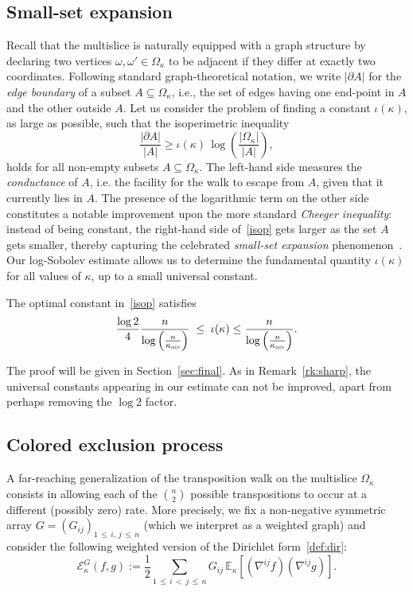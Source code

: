 \documentclass[AHL,Unicode,longabstracts,published]{cedram}
\newcommand{\EE}{\mathbb{E}}
\newcommand{\cE}{\mathcal{E}}
\newcommand{\am}{{\kappa_{\textsc{min}}}}
\begin{document}
\subsection{Small-set expansion}
Recall that the multislice is naturally equipped with a graph structure by declaring two vertices $\omega,\omega'\in\Omega_\kappa$ to be adjacent if they differ at exactly two coordinates. Following standard graph-theoretical notation, we write $|\partial A|$ for the \emph{edge boundary} of a subset $A\subseteq \Omega_\kappa$, i.e., the set of edges having one end-point in $A$ and the other outside $A$. Let us consider the problem of finding a constant $\iota(\kappa)$, as large as possible, such that the isoperimetric inequality
\begin{equation}\label{isop}
\frac{|\partial A|}{|A|} \ge \iota(\kappa)\,\log\left(\frac{|\Omega_\kappa|}{|A|}\right),
\end{equation}
holds for all non-empty subsets $A\subseteq \Omega_\kappa$. The left-hand side measures the \emph{conductance} of $A$, i.e. the facility for the walk to escape from $A$, given that it currently lies in $A$. The presence of the logarithmic term on the other side constitutes a notable improvement upon the more standard \emph{Cheeger inequality}: instead of being constant, the right-hand side of~\eqref{isop} gets larger as the set $A$ gets smaller, thereby capturing the celebrated \emph{small-set expansion} phenomenon~\cite{2018arXiv180903546F,21923,MR1798047}. Our log-Sobolev estimate allows us to determine the fundamental quantity $\iota(\kappa)$ for all values of $\kappa$, up to a small universal constant.

\begin{coro}\label{co:exp}
The optimal constant in~\eqref{isop} satisfies
\begin{equation}
\frac{\log 2}{4}\frac{n}{\log\left(\frac{n}{\am}\right)} \; \le \; \iota(\kappa) \le \frac{n}{\log\left(\frac{n}{\am}\right)}.
\end{equation}
\end{coro}

The proof will be given in Section~\ref{sec:final}. As in Remark~\ref{rk:sharp}, the universal constants appearing in our estimate can not be improved, apart from perhaps removing the $\log 2$ factor.

\subsection{Colored exclusion process}
A far-reaching generalization of the transposition walk on the multislice $\Omega_\kappa$ consists in allowing each of the $\binom{n}{2}$ possible transpositions to occur at a different (possibly zero) rate. More precisely, we fix a non-negative symmetric array $G=(G_{ij})_{1\,\le\,i,\,j\,\le\,n}$ (which we interpret as a weighted graph) and consider the following weighted version of the Dirichlet form~\eqref{def:dir}:
\begin{equation}\label{def:weighted}
\cE_{\kappa}^G\left(f,g\right) := \frac{1}{2}\sum_{1\,\le\,i\,<\,j\,\le\,n}G_{ij}\,\EE_\kappa\left[\left(\nabla^{ij}f\right)\left(\nabla^{ij}g\right)\right].
\end{equation}
\end{document}
